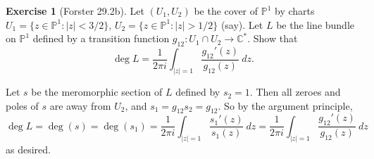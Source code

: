 \documentclass[10pt]{article}
\newcommand{\CC}{\mathbb{C}}
\newcommand{\PP}{\mathbb P}
\theoremstyle{definition}
\newtheorem{exer}{Exercise}
\begin{document}
\begin{exer}[Forster 29.2b]
Let $(U_1, U_2)$ be the cover of $\PP^1$ by charts $U_1 = \{z \in \PP^1: |z| < 3/2\}$, $U_2 = \{z \in \PP^1: |z| > 1/2\}$ (say).
Let $L$ be the line bundle on $\PP^1$ defined by a transition function $g_{12}: U_1 \cap U_2 \to \CC^*$.
Show that
$$\deg L = \frac{1}{2\pi i} \int_{|z| = 1} \frac{g_{12}'(z)}{g_{12}(z)} ~dz.$$
\end{exer}

Let $s$ be the meromorphic section of $L$ defined by $s_2 = 1$. Then all zeroes and poles of $s$ are away from $U_2$, and $s_1 = g_{12}s_2 = g_{12}$.
So by the argument principle,
$$\deg L = \deg(s) = \deg(s_1) = \frac{1}{2\pi i} \int_{|z| = 1} \frac{s_1'(z)}{s_1(z)} ~dz = \frac{1}{2\pi i} \int_{|z| = 1} \frac{g_{12}'(z)}{g_{12}(z)} ~dz$$
as desired.
\end{document}
